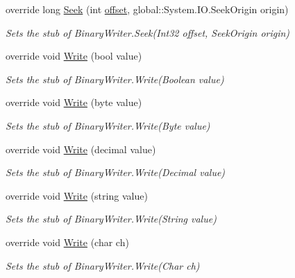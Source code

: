 \begin{DoxyCompactItemize}
override long \hyperlink{class_system_1_1_i_o_1_1_fakes_1_1_stub_binary_writer_ac279aafef0c4ba5af7f939bbd467b1ce}{Seek} (int \hyperlink{jquery-1_810_82_8js_a4a9f594d20d927164551fc7fa4751a2f}{offset}, global\-::\-System.\-I\-O.\-Seek\-Origin origin)
\begin{DoxyCompactList}\small\item\em Sets the stub of Binary\-Writer.\-Seek(\-Int32 offset, Seek\-Origin origin)\end{DoxyCompactList}\item 
override void \hyperlink{class_system_1_1_i_o_1_1_fakes_1_1_stub_binary_writer_a2b536f6851d3e551099418da963d9cae}{Write} (bool value)
\begin{DoxyCompactList}\small\item\em Sets the stub of Binary\-Writer.\-Write(\-Boolean value)\end{DoxyCompactList}\item 
override void \hyperlink{class_system_1_1_i_o_1_1_fakes_1_1_stub_binary_writer_a833dac09c5a9859dbfa1ee93716afb7d}{Write} (byte value)
\begin{DoxyCompactList}\small\item\em Sets the stub of Binary\-Writer.\-Write(\-Byte value)\end{DoxyCompactList}\item 
override void \hyperlink{class_system_1_1_i_o_1_1_fakes_1_1_stub_binary_writer_a9e9f6a2eec211f79e18df183ada7182a}{Write} (decimal value)
\begin{DoxyCompactList}\small\item\em Sets the stub of Binary\-Writer.\-Write(\-Decimal value)\end{DoxyCompactList}\item 
override void \hyperlink{class_system_1_1_i_o_1_1_fakes_1_1_stub_binary_writer_a488294d062996606330bad9b0b8c5ae6}{Write} (string value)
\begin{DoxyCompactList}\small\item\em Sets the stub of Binary\-Writer.\-Write(\-String value)\end{DoxyCompactList}\item 
override void \hyperlink{class_system_1_1_i_o_1_1_fakes_1_1_stub_binary_writer_a662add3f95d48bdfd8ed7a898b15325d}{Write} (char ch)
\begin{DoxyCompactList}\small\item\em Sets the stub of Binary\-Writer.\-Write(\-Char ch)\end{DoxyCompactList}\item 

\end{DoxyCompactItemize}
